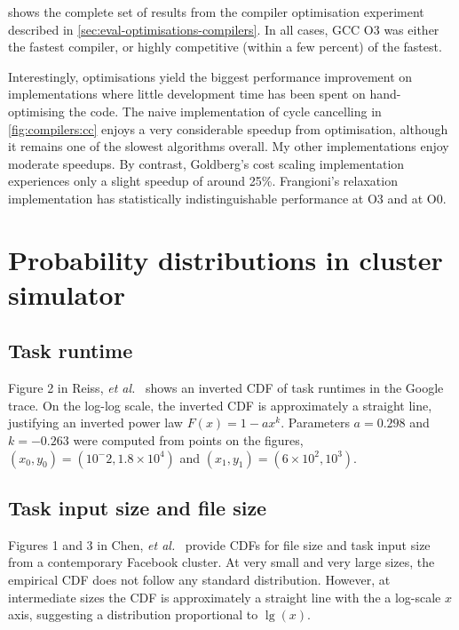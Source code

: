  shows the complete set of results from the compiler optimisation experiment described in \cref{sec:eval-optimisations-compilers}. In all cases, GCC O3 was either the fastest compiler, or highly competitive (within a few percent) of the fastest. 

Interestingly, optimisations yield the biggest performance improvement on implementations where little development time has been spent on hand-optimising the code. The naive implementation of cycle cancelling in \cref{fig:compilers:cc} enjoys a very considerable speedup from optimisation, although it remains one of the slowest algorithms overall\footnotemark. My other implementations enjoy moderate speedups. By contrast, Goldberg's cost scaling implementation experiences only a slight speedup of around 25\%. Frangioni's relaxation implementation has statistically indistinguishable performance at O3 and at O0.

\section{Probability distributions in cluster simulator} \label{appendix:test-distributions}

\subsection{Task runtime}

Figure 2 in Reiss, \textit{et al.}~\cite{Reiss:2012} shows an inverted CDF of task runtimes in the Google trace. On the log-log scale, the inverted CDF is approximately a straight line, justifying an inverted power law $F(x) = 1 - ax^k$. Parameters $a = 0.298$ and $k=-0.263$ were computed from points on the figures, $\left(x_0,y_0\right) = \left(10^-2,1.8\times 10^4\right)$ and $\left(x_1,y_1\right)=\left(6\times 10^2, 10^3\right)$.

\subsection{Task input size and file size}

Figures 1 and 3 in Chen, \textit{et al.}~\cite{Chen:2012} provide CDFs for file size and task input size from a contemporary Facebook cluster. At very small and very large sizes, the empirical CDF does not follow any standard distribution. However, at intermediate sizes the CDF is approximately a straight line with the a log-scale $x$ axis, suggesting a distribution proportional to $\lg(x)$.


